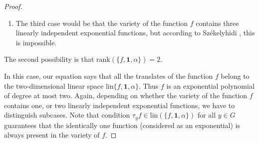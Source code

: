 \documentclass[a4paper,12pt]{article}
\theoremstyle{plain}
\theoremstyle{definition}
\theoremstyle{remark}
\begin{document}
\begin{proof}
\begin{enumerate}[{Subcase} (i)]
The other possibility is that $\alpha_{3}+\alpha_{2}=0$, and then $\gamma_{2}= \alpha_{2}^{2}$ and $\gamma_{3}=-\alpha_{2}^2$. Thus 
\[
 \alpha(x)= \alpha_{2}m(x)-\alpha_{2} 
 \quad 
 \text{and}
 \quad 
 f(x)= \gamma_{1}a(x)+\alpha_{2}^{2}m(x)-\alpha_{2}^{2}
\]
holds for all $x\in G$. An easy computation shows that these functions indeed solve our equation.  
\item The third case would be that the variety of the function $f$ contains three linearly independent exponential functions, but according to Székelyhidi \cite[page 92]{Sze91}, this is impossible.
\end{enumerate}

The second possibility is that $\mathrm{rank}(\{f, \mathbf{1}, \alpha \})=2$. 

In this case, our equation says that all the translates of the function $f$ belong to the two-dimensional linear space $\mathrm{lin}\{f, \mathbf{1}, \alpha \}$. Thus $f$ is an exponential polynomial of degree at most two. 
Again, depending on whether the variety of the function $f$ contains one,  or two linearly independent exponential functions, we have to distinguish subcases. Note that condition 
$\tau_{y}f\in \mathrm{lin}(\{f, \mathbf{1}, \alpha\})$ for all $y\in G$ guarantees that the identically one function (considered as an exponential) is always present in the variety of $f$.



\end{proof}
\end{document}
